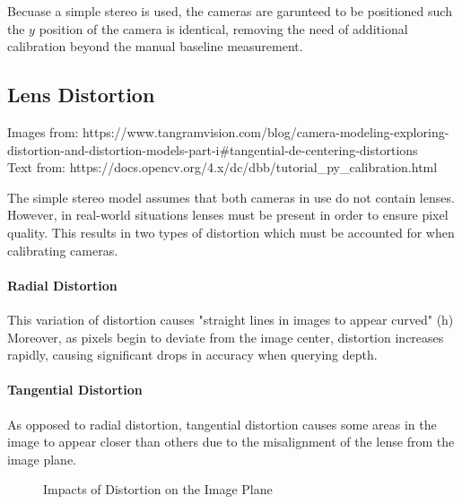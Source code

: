\documentclass[11pt]{scrartcl}
\begin{document}
\begin{remark}
    Becuase a simple stereo is used, the cameras are garunteed to be positioned 
    such the $y$ position of the camera is identical, removing the need of additional 
    calibration beyond the manual baseline measurement. 
\end{remark}

\subsection{Lens Distortion}
\begin{remark}
    Images from: https://www.tangramvision.com/blog/camera-modeling-exploring-distortion-and-distortion-models-part-i#tangential-de-centering-distortions
    \\ Text from: https://docs.opencv.org/4.x/dc/dbb/tutorial_py_calibration.html  
\end{remark}
The simple stereo model assumes that both cameras in use do not contain lenses. 
However, in real-world situations lenses must be present in order to ensure pixel 
quality. This results in two types of distortion which must be accounted for when
calibrating cameras.  
\paragraph{Radial Distortion}
    This variation of distortion causes "straight lines in images to appear curved" (h)
    Moreover, as pixels begin to deviate from the image center, distortion increases rapidly, 
    causing significant drops in accuracy when querying depth. 
\paragraph{Tangential Distortion}
    As opposed to radial distortion, tangential distortion causes some areas in the image to appear 
    closer than others due to the misalignment of the lense from the image plane. 
\\
\begin{figure}[!htb]
    \centering
    \qquad
    \label{fig:example}%
    \caption{Impacts of Distortion on the Image Plane}
\end{figure}
\\ 
\end{document}

